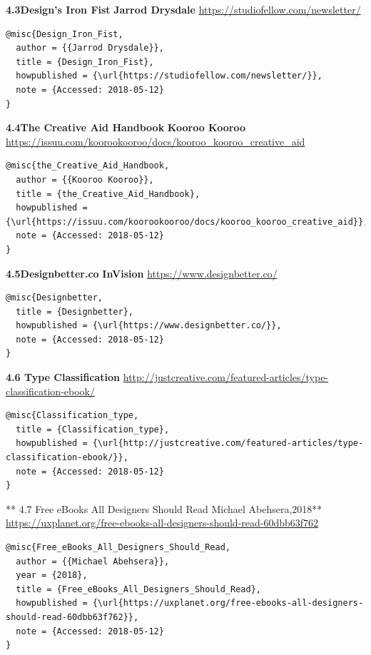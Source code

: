 \documentclass[]{book}
\theoremstyle{definition}
\theoremstyle{definition}
\theoremstyle{definition}
\theoremstyle{remark}
\begin{document}
\textbf{4.3Design's Iron Fist} \textbf{Jarrod Drysdale}
\url{https://studiofellow.com/newsletter/} \citep{Design_Iron_Fist}

\begin{verbatim}
@misc{Design_Iron_Fist,
  author = {{Jarrod Drysdale}},
  title = {Design_Iron_Fist},
  howpublished = {\url{https://studiofellow.com/newsletter/}},
  note = {Accessed: 2018-05-12}
}
\end{verbatim}

\textbf{4.4The Creative Aid Handbook} \textbf{Kooroo Kooroo}
\url{https://issuu.com/koorookooroo/docs/kooroo_kooroo_creative_aid}
\citep{The_Creative_Aid_Handbook}

\begin{verbatim}
@misc{the_Creative_Aid_Handbook,
  author = {{Kooroo Kooroo}},
  title = {the_Creative_Aid_Handbook},
  howpublished = {\url{https://issuu.com/koorookooroo/docs/kooroo_kooroo_creative_aid}},
  note = {Accessed: 2018-05-12}
}
\end{verbatim}

\textbf{4.5Designbetter.co} \textbf{InVision}
\url{https://www.designbetter.co/} \citep{Designbetter}

\begin{verbatim}
@misc{Designbetter,
  title = {Designbetter},
  howpublished = {\url{https://www.designbetter.co/}},
  note = {Accessed: 2018-05-12}
}
\end{verbatim}

\textbf{4.6 Type Classification}
\url{http://justcreative.com/featured-articles/type-classification-ebook/}
\citep{Classification_type}

\begin{verbatim}
@misc{Classification_type,
  title = {Classification_type},
  howpublished = {\url{http://justcreative.com/featured-articles/type-classification-ebook/}},
  note = {Accessed: 2018-05-12}
}
\end{verbatim}

** 4.7 Free eBooks All Designers Should Read\textbf{ } Michael
Abehsera,2018**
\url{https://uxplanet.org/free-ebooks-all-designers-should-read-60dbb63f762}
\citep{Free_eBooks_All_Designers_Should_Read}

\begin{verbatim}
@misc{Free_eBooks_All_Designers_Should_Read,
  author = {{Michael Abehsera}},
  year = {2018},
  title = {Free_eBooks_All_Designers_Should_Read},
  howpublished = {\url{https://uxplanet.org/free-ebooks-all-designers-should-read-60dbb63f762}},
  note = {Accessed: 2018-05-12}
}
\end{verbatim}
\end{document}
